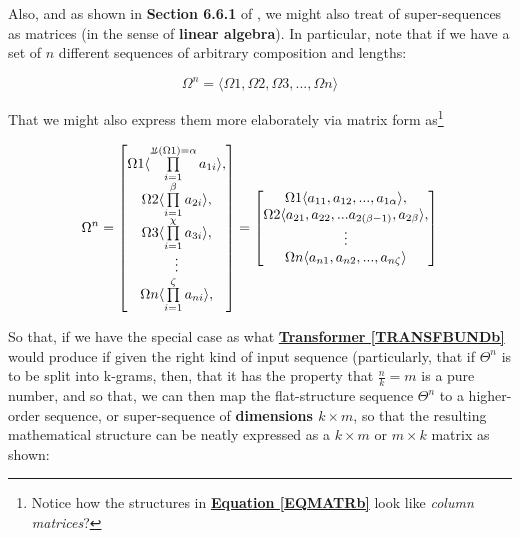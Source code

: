 \documentclass[a4paper, 18pt]{book} %
\newcommand{\invpi}{\rotatebox[origin=c]{180}{$\pi$}}
\begin{document}
Also, and as shown in \textbf{Section 6.6.1} of \cite{lutalo_2025_trans_genetics}, we might also treat of super-sequences as matrices (in the sense of \textbf{linear algebra}). In particular, note that if we have a set of $n$ different sequences of arbitrary composition and lengths:

\vspace{1em}
\begin{equation}
 \Omega^n = \langle \Omega1, \Omega2, \Omega3,..., \Omega n \rangle
\end{equation}
\vspace{1em}


That we might also express them more elaborately via matrix form as\footnote{Notice how the structures in \textbf{\hyperref[EQMATRb]{Equation \ref{EQMATRb}}} look like \textit{column matrices}?}

\vspace{1em}
\begin{multline}
\label{EQMATRb}
 \Omega^n = 
 \begin{bmatrix}
 \Omega1 \langle \prod\limits_{i=1}^{\invpi(\Omega 1) = \alpha} a_{1i} \rangle,\\
  \Omega2 \langle \prod\limits_{i=1}^{\beta} a_{2i} \rangle,\\
   \Omega3 \langle \prod\limits_{i=1}^{\chi} a_{3i} \rangle,\\
   \vdots \\
   \Omega n \langle \prod\limits_{i=1}^{\zeta} a_{ni} \rangle,\\
 \end{bmatrix} =
 \begin{bmatrix}
 \Omega1 \langle a_{11},a_{12},...,a_{1\alpha} \rangle,\\
   \Omega2 \langle a_{21},a_{22},...a_{2(\beta-1)} ,a_{2\beta} \rangle,\\
   \vdots \\
     \Omega n \langle a_{n1},a_{n2},...,a_{n\zeta} \rangle\\
 \end{bmatrix}
\end{multline}
\vspace{1em}


So that, if we have the special case as what \textbf{\hyperref[TRANSFBUNDb]{Transformer \ref{TRANSFBUNDb}}} would produce if given the right kind of input sequence (particularly, that if $\Theta^n$ is to be split into k-grams, then, that it has the property that $\frac{n}{k} = m$ is a pure number\cite{Lutalo2024gtnc}, and so that, we can then map the flat-structure sequence $\Theta^n$ to a higher-order sequence, or super-sequence of \textbf{dimensions $k \times m$}, so that the resulting mathematical structure can be neatly expressed as a  $k \times m$ or $m \times k$ matrix as shown:
\end{document}
